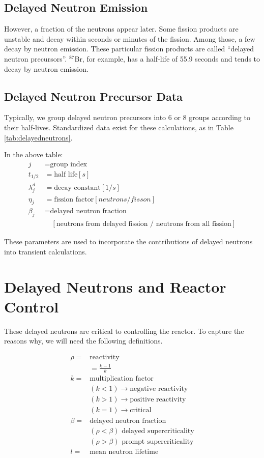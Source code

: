 \documentclass[12pt]{article}
\begin{document}
\subsection{Delayed Neutron Emission}
However, a fraction of the neutrons appear later. Some fission products are 
unstable and decay within seconds or minutes of the fission. Among those, a few 
decay by neutron emission. These particular fission products are called ``delayed 
neutron precursors''.  $^{87}$Br, for example, has a half-life of 55.9 seconds 
and tends to decay by neutron emission.

\subsection{Delayed Neutron Precursor Data}
Typically, we group delayed neutron precursors into 6 or 8 groups according to 
their half-lives. Standardized data exist for these calculations, as in Table 
\ref{tab:delayedneutrons}.



In the above table:
\begin{align*}
j &= \mbox{group index}\\
t_{1/2} &= \mbox{half life} [s]\\
\lambda_j^d &= \mbox{decay constant} [1/s]\\
\eta_j &= \mbox{fission factor} [neutrons/fisson]\\
\beta_j &= \mbox{delayed neutron fraction} \\&\quad[\text{neutrons from delayed fission / neutrons from all fission}]\nonumber
\end{align*}

These parameters are used to incorporate the contributions of delayed neutrons 
into transient calculations.

\section{Delayed Neutrons and Reactor Control}
These delayed neutrons are critical to controlling the reactor. 
To capture the reasons why, we will need the following definitions.

\begin{align*}
\rho =& \mbox{reactivity}\\
&= \frac{k-1}{k}\\
k =& \mbox{multiplication factor}\\
&(k < 1) \rightarrow \mbox{negative reactivity}\\
&(k > 1) \rightarrow \mbox{positive reactivity}\\
&(k = 1) \rightarrow \mbox{critical}\\
\beta =& \mbox{delayed neutron fraction}\\
&(\rho < \beta) \mbox{ delayed supercriticality}\\
&(\rho > \beta) \mbox{ prompt supercriticality}\\
l =& \mbox{mean neutron lifetime}
\end{align*}
\end{document}

